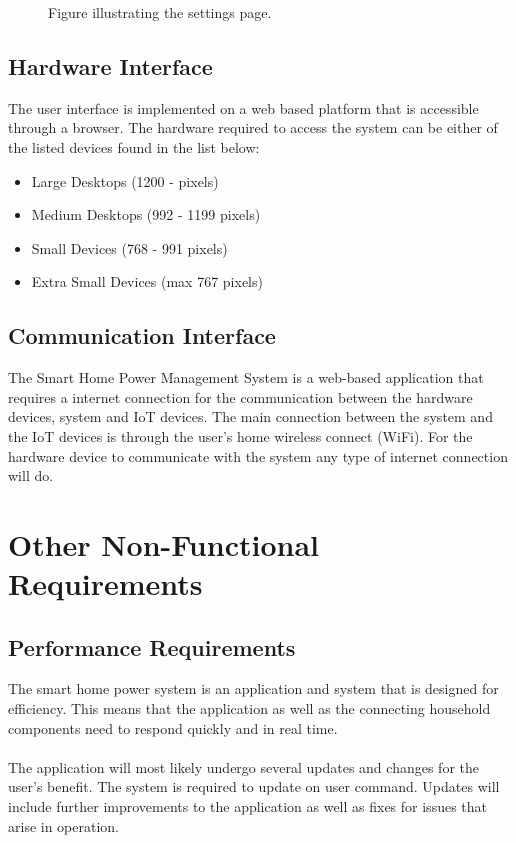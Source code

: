 \documentclass[11pt, a4paper]{article}
\begin{document}
\begin{itemize}
\begin{figure}[!h]
				\caption{Figure illustrating the settings page.}
				\label{Settings}
			\end{figure}
	\end{itemize}
	
	\pagebreak
	\subsection{Hardware Interface}
	The user interface is implemented on a web based platform that is accessible through a browser. The hardware required to access the system can be either of the listed devices found in the list below:
	
	\begin{itemize}
		\item Large Desktops (1200 -  pixels)
		\item Medium Desktops (992 - 1199 pixels)
		\item Small Devices (768 - 991 pixels)
		\item Extra Small Devices (max 767 pixels)
	\end{itemize}
	
	\subsection{Communication Interface}
	The Smart Home Power Management System is a web-based application that requires a internet connection for the communication between the hardware devices, system and IoT devices. The main connection between the system and the IoT devices is through the user's home wireless connect (WiFi). For the hardware device to communicate with the system any type of internet connection will do.
	
	\section{Other Non-Functional Requirements}
	
	\subsection{Performance Requirements}
	The smart home power system is an application and system that is designed for efficiency. This means that the application as well as the connecting household components need to respond quickly and in real time. 
	\\\\
	The application will most likely undergo several updates and changes for the user's benefit. The system is required to update on user command. Updates will include further improvements to the application as well as fixes for issues that arise in operation.
	
\end{document}
